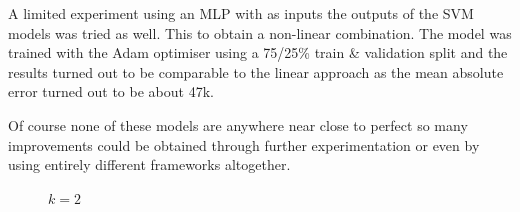 \par A limited experiment using an MLP with as inputs the outputs of the SVM models was tried as well. This to obtain a non-linear combination. The model was trained with the Adam optimiser using a 75/25\% train \& validation split and the results turned out to be comparable to the linear approach as the mean absolute error turned out to be about 47k.

\par Of course none of these models are anywhere near close to perfect so many improvements could be obtained through further experimentation or even by using entirely different frameworks altogether.

\endgroup

\begin{figure}[!htb]
\vspace{-0.5cm}
\centering
\begin{minipage}{\textwidth}
        \centering
        \hfil
	\hfil
	\hfil
	\caption*{$k=2$}
\end{minipage}
\begin{minipage}{\textwidth}
        \centering

\end{minipage}
\end{figure}
